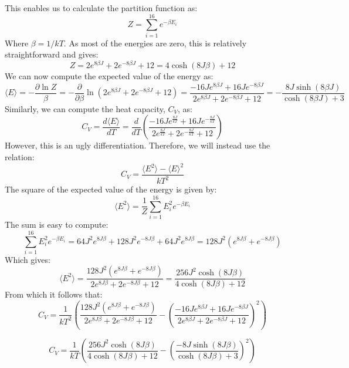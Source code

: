 \documentclass[a4paper, 10pt]{article}
\begin{document}
\linebreak
This enables us to calculate the partition function as:
$$Z=\sum_{i=1}^{16} e^{-\beta E_i}$$
Where $\beta=1/kT$. As most of the energies are zero, this is relatively straightforward and gives:
$$Z=2e^{8\beta J}+2e^{-8\beta J} + 12=4\cosh (8J\beta) +12$$
We can now compute the expected value of the energy as:
\begin{equation}\label{eq:2x2energy}
\langle E \rangle =  -\frac{\partial \ln Z}{\beta}=-\frac{\partial}{\partial \beta}\ln\left(2e^{8\beta J}+2e^{-8\beta J}+12\right)=\frac{-16Je^{8\beta J}+16Je^{-8\beta J}}{2e^{8\beta J}+2e^{-8\beta J}+12}=-\frac{8J\sinh(8\beta J)}{\cosh(8\beta J)+3}
\end{equation}
Similarly, we can compute the heat capacity, $C_V$, as:
$$C_V=\frac{d\langle E \rangle}{dT}=\frac{d}{dT}\left(\frac{-16Je^{\frac{8J}{kT}}+16Je^{-\frac{8J}{kT}}}{2e^{\frac{8J}{kT}}+2e^{-\frac{8J}{kT}}+12}\right)$$
However, this is an ugly differentiation. Therefore, we will instead use the relation:
$$C_V=\frac{\langle E^2 \rangle - \langle E \rangle^2}{kT^2}$$
The square of the expected value of the energy is given by:
$$\langle E^2\rangle=\frac{1}{Z} \sum_{i=1}^ {16}E_i^2e^{-\beta E_i}$$
The sum is easy to compute:
$$\sum_{i=1}^{16}E_i^2e^{-\beta E_i}=64J^2e^{8J\beta}+128J^2e^{-8J\beta}+64J^2e^{8J\beta}=128J^2\left(e^{8J\beta}+e^{-8J\beta}\right)$$
Which gives:
$$\langle E^2\rangle = \frac{128J^2\left(e^{8J\beta}+e^{-8J\beta}\right)}{2e^{8J\beta}+2e^{-8J\beta}+12}=\frac{256J^2\cosh(8J\beta)}{4\cosh(8J\beta)+12}$$
From which it follows that:
$$C_V=\frac{1}{kT^2}\left(\frac{128J^2\left(e^{8J\beta}+e^{-8J\beta}\right)}{2e^{8J\beta}+2e^{-8J\beta}+12}-\left(\frac{-16Je^{8\beta J}+16Je^{-8\beta J}}{2e^{8\beta J}+2e^{-8\beta J}+12}\right)^2\right)$$

\begin{equation}\label{eq:2x2Cv}
C_V=\frac{1}{kT}\left(\frac{256J^2\cosh(8J\beta)}{4\cosh(8J\beta)+12}-\left(\frac{-8J\sinh(8J\beta)}{\cosh(8J\beta)+3}\right)^2\right)
\end{equation}
\end{document}
